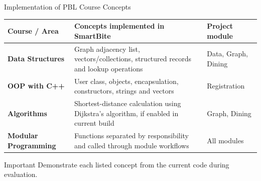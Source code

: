 \documentclass[aspectratio=169,10pt]{beamer}
\begin{document}
\begin{frame}{Implementation of PBL Course Concepts}
\scriptsize
\begin{center}
\renewcommand{\arraystretch}{1.35}
\begin{tabularx}{.96\textwidth}{@{}>{\bfseries}p{3.0cm}X p{2.5cm}@{}}
\toprule
Course / Area & Concepts implemented in SmartBite & Project module\\
\midrule
Data Structures & Graph adjacency list, vectors/collections, structured records and lookup operations & Data, Graph, Dining\\
OOP with C++ & User class, objects, encapsulation, constructors, strings and vectors & Registration\\
Algorithms & Shortest-distance calculation using Dijkstra's algorithm, if enabled in current build & Graph, Dining\\
Modular Programming & Functions separated by responsibility and called through module workflows & All modules\\
\bottomrule
\end{tabularx}
\end{center}
\vspace{4mm}
\begin{block}{Important}
Demonstrate each listed concept from the current code during evaluation.
\end{block}
\end{frame}
\end{document}
